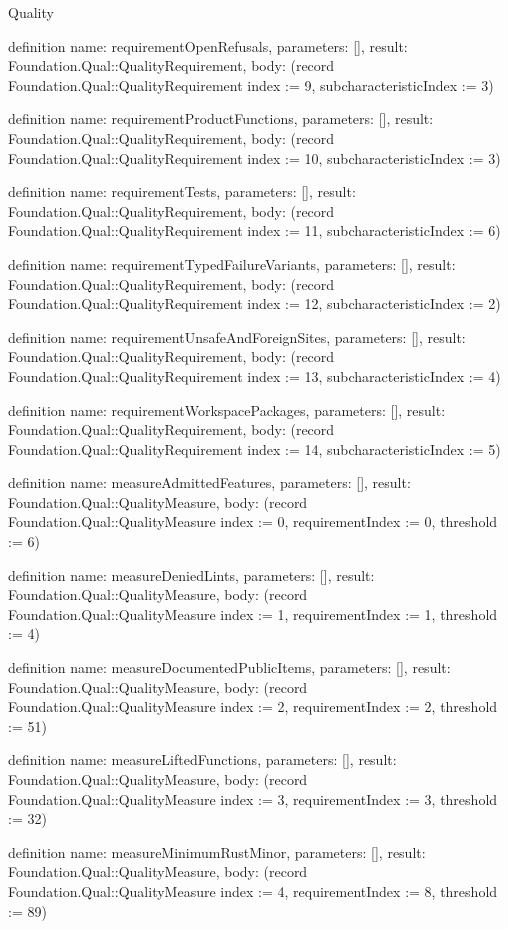 \begin{lexlean}{Quality}
\begin{semanticmodule}
definition{
  name: requirementOpenRefusals,
  parameters: [],
  result: Foundation.Qual::QualityRequirement,
  body: (record Foundation.Qual::QualityRequirement {index := 9, subcharacteristicIndex := 3})
}

definition{
  name: requirementProductFunctions,
  parameters: [],
  result: Foundation.Qual::QualityRequirement,
  body: (record Foundation.Qual::QualityRequirement {index := 10, subcharacteristicIndex := 3})
}

definition{
  name: requirementTests,
  parameters: [],
  result: Foundation.Qual::QualityRequirement,
  body: (record Foundation.Qual::QualityRequirement {index := 11, subcharacteristicIndex := 6})
}

definition{
  name: requirementTypedFailureVariants,
  parameters: [],
  result: Foundation.Qual::QualityRequirement,
  body: (record Foundation.Qual::QualityRequirement {index := 12, subcharacteristicIndex := 2})
}

definition{
  name: requirementUnsafeAndForeignSites,
  parameters: [],
  result: Foundation.Qual::QualityRequirement,
  body: (record Foundation.Qual::QualityRequirement {index := 13, subcharacteristicIndex := 4})
}

definition{
  name: requirementWorkspacePackages,
  parameters: [],
  result: Foundation.Qual::QualityRequirement,
  body: (record Foundation.Qual::QualityRequirement {index := 14, subcharacteristicIndex := 5})
}

definition{
  name: measureAdmittedFeatures,
  parameters: [],
  result: Foundation.Qual::QualityMeasure,
  body: (record Foundation.Qual::QualityMeasure {index := 0, requirementIndex := 0, threshold := 6})
}

definition{
  name: measureDeniedLints,
  parameters: [],
  result: Foundation.Qual::QualityMeasure,
  body: (record Foundation.Qual::QualityMeasure {index := 1, requirementIndex := 1, threshold := 4})
}

definition{
  name: measureDocumentedPublicItems,
  parameters: [],
  result: Foundation.Qual::QualityMeasure,
  body: (record Foundation.Qual::QualityMeasure {index := 2, requirementIndex := 2, threshold := 51})
}

definition{
  name: measureLiftedFunctions,
  parameters: [],
  result: Foundation.Qual::QualityMeasure,
  body: (record Foundation.Qual::QualityMeasure {index := 3, requirementIndex := 3, threshold := 32})
}

definition{
  name: measureMinimumRustMinor,
  parameters: [],
  result: Foundation.Qual::QualityMeasure,
  body: (record Foundation.Qual::QualityMeasure {index := 4, requirementIndex := 8, threshold := 89})
}


\end{semanticmodule}
\end{lexlean}
